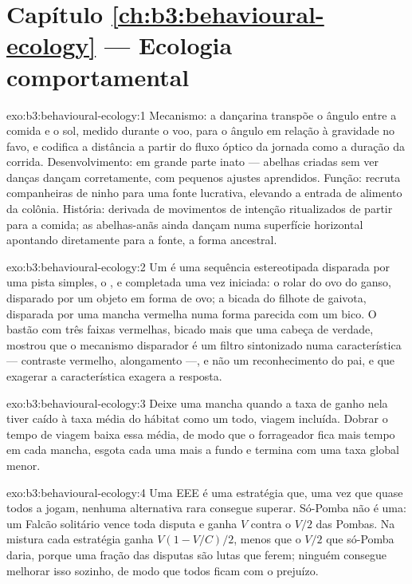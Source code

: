 \section*{Capítulo \ref{ch:b3:behavioural-ecology} --- Ecologia comportamental}

\begin{solution}{exo:b3:behavioural-ecology:1}
Mecanismo: a dançarina transpõe o ângulo entre a comida e o sol, medido
durante o voo, para o ângulo em relação à gravidade no favo, e codifica a
distância a partir do fluxo óptico da jornada como a duração da corrida.
Desenvolvimento: em grande parte inato --- abelhas criadas sem ver danças
dançam corretamente, com pequenos ajustes aprendidos. Função: recruta
companheiras de ninho para uma fonte lucrativa, elevando a entrada de
alimento da colônia. História: derivada de movimentos de intenção
ritualizados de partir para a comida; as abelhas-anãs ainda dançam numa
superfície horizontal apontando diretamente para a fonte, a forma
ancestral.
\end{solution}

\begin{solution}{exo:b3:behavioural-ecology:2}
Um  é uma sequência estereotipada disparada por uma
pista simples, o , e completada uma vez iniciada: o rolar
do ovo do ganso, disparado por um objeto em forma de ovo; a bicada do
filhote de gaivota, disparada por uma mancha vermelha numa forma
parecida com um bico. O bastão com três faixas vermelhas, bicado mais que
uma cabeça de verdade, mostrou que o mecanismo disparador é um filtro
sintonizado numa característica --- contraste vermelho, alongamento ---,
e não um reconhecimento do pai, e que exagerar a característica exagera a
resposta.
\end{solution}

\begin{solution}{exo:b3:behavioural-ecology:3}
Deixe uma mancha quando a taxa de ganho nela tiver caído à taxa média do
hábitat como um todo, viagem incluída. Dobrar o tempo de viagem baixa
essa média, de modo que o forrageador fica mais tempo em cada mancha,
esgota cada uma mais a fundo e termina com uma taxa global menor.
\end{solution}

\begin{solution}{exo:b3:behavioural-ecology:4}
Uma EEE é uma estratégia que, uma vez que quase todos a jogam, nenhuma
alternativa rara consegue superar. Só-Pomba não é uma: um Falcão
solitário vence toda disputa e ganha $V$ contra o $V/2$ das Pombas. Na
mistura cada estratégia ganha $V(1 - V/C)/2$, menos que o $V/2$ que
só-Pomba daria, porque uma fração das disputas são lutas que ferem;
ninguém consegue melhorar isso sozinho, de modo que todos ficam com o
prejuízo.
\end{solution}

